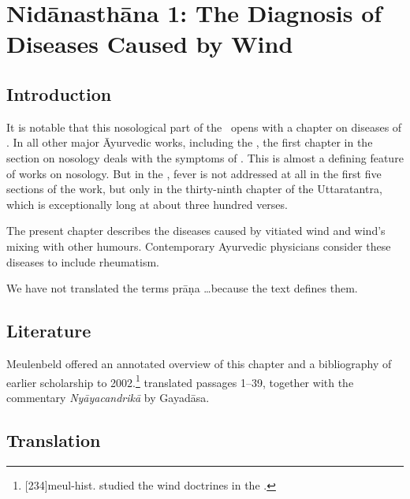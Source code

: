 
\chapter{Nidānasthāna 1: The Diagnosis of Diseases Caused by Wind}


\section{Introduction}

It is notable that this nosological part of the \SS\ opens with a chapter on
diseases of .  In all other major Āyurvedic works, including the
\CS, the first chapter in the section on nosology deals with the symptoms of
.  This is almost a defining feature of works on nosology.  But
in the \SS, fever is not addressed at all in the first five sections of the
work, but only in the thirty-ninth chapter of the Uttaratantra, which is
exceptionally long at about three hundred verses.

The present chapter describes the diseases caused by vitiated wind and wind's
mixing with other humours. Contemporary Ayurvedic physicians consider these
diseases to include rheumatism. 

We have not translated the terms prāṇa \ldots because the text defines
them.

\section{Literature}

Meulenbeld offered an annotated overview of this chapter and a
bibliography of earlier scholarship to
2002.\footnote{[234]{meul-hist}. \citep{rube-1954b}
    studied the wind doctrines in the \CS.}  \citet{adri-1984} translated
    passages 1--39, together with the commentary \emph{Nyāyacandrikā} by
    Gayadāsa.



\section{Translation}

